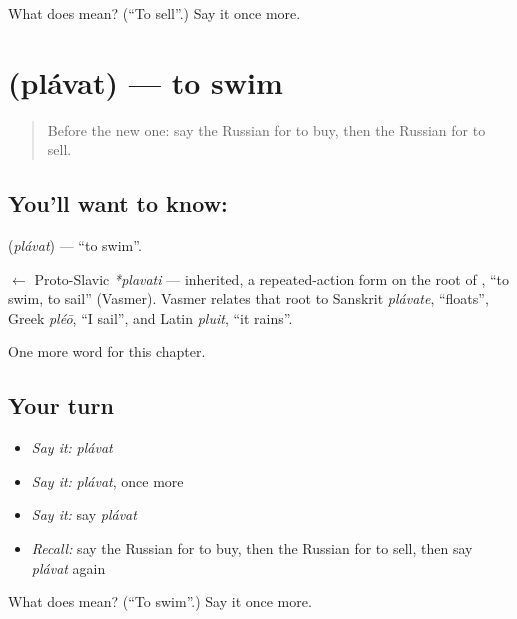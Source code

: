 \begin{tcolorbox}[breakable,colback=teal!4,colframe=teal!35!black,title={Before you move on}]
What does  mean? (\textquotedblleft{}To sell\textquotedblright{}.) Say it once more.
\end{tcolorbox}
\section[\texorpdfstring{\ru{плавать} (plávat)}{плавать (plávat)}]{ (plávat) — to swim}

\label{lesson:RU-C39-plavat}



\begin{quote}
Before the new one: say the Russian for to buy, then the Russian for to sell.
\end{quote}

\subsection*{You'll want to know: }
\textbf{} (\emph{plávat}) — \textquotedblleft{}to swim\textquotedblright{}.

\begin{cousinweb}
\textbf{} $\leftarrow$ Proto-Slavic \emph{*plavati} — inherited, a repeated-action form on the root of \emph{}, \textquotedblleft{}to swim, to sail\textquotedblright{} (Vasmer). Vasmer relates that root to Sanskrit \emph{plávate}, \textquotedblleft{}floats\textquotedblright{}, Greek \emph{pléō}, \textquotedblleft{}I sail\textquotedblright{}, and Latin \emph{pluit}, \textquotedblleft{}it rains\textquotedblright{}.
\end{cousinweb}

\begin{grammarlens}[title={What you've built}]
One more word for this chapter.
\end{grammarlens}

\subsection*{Your turn}
\begin{itemize}
\raggedright
  \item \emph{Say it:} \emph{plávat}
  \item \emph{Say it:} \emph{plávat}, once more
  \item \emph{Say it:} say \emph{plávat}
  \item \emph{Recall:} say the Russian for to buy, then the Russian for to sell, then say \emph{plávat} again
\end{itemize}

\begin{tcolorbox}[breakable,colback=teal!4,colframe=teal!35!black,title={Before you move on}]
What does  mean? (\textquotedblleft{}To swim\textquotedblright{}.) Say it once more.
\end{tcolorbox}
